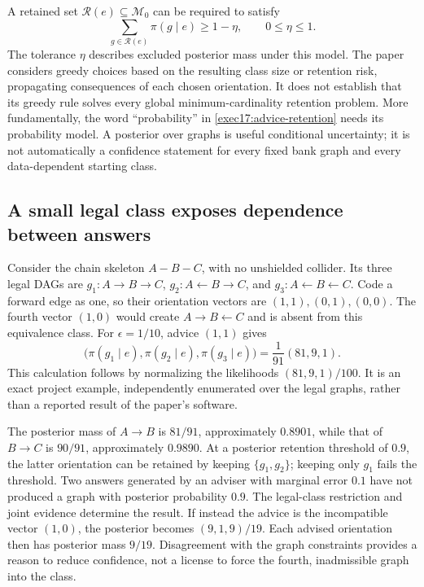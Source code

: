 A retained set $\mathcal R(e)\subseteq\mathcal M_0$ can be required to satisfy
\begin{equation}
 \sum_{g\in\mathcal R(e)}\pi(g\mid e)\geq 1-\eta,
 \qquad 0\leq\eta\leq1.
\label{exec17:advice-retention}
\end{equation}
The tolerance $\eta$ describes excluded posterior mass under this model.
The paper considers greedy choices based on the resulting class size or
retention risk, propagating consequences of each chosen orientation. It does
not establish that its greedy rule solves every global minimum-cardinality
retention problem. More fundamentally, the word ``probability'' in
\eqref{exec17:advice-retention} needs its probability model. A posterior over
graphs is useful conditional uncertainty; it is not automatically a
confidence statement for every fixed bank graph and every data-dependent
starting class.

\subsection{A small legal class exposes dependence between answers}

Consider the chain skeleton $A-B-C$, with no unshielded collider. Its three
legal DAGs are $g_1:A\to B\to C$, $g_2:A\leftarrow B\to C$, and
$g_3:A\leftarrow B\leftarrow C$. Code a forward edge as one, so their
orientation vectors are $(1,1),(0,1),(0,0)$. The fourth vector $(1,0)$ would
create $A\to B\leftarrow C$ and is absent from this equivalence class.
For $\epsilon=1/10$, advice $(1,1)$ gives
\begin{equation}
 \bigl(\pi(g_1\mid e),\pi(g_2\mid e),\pi(g_3\mid e)\bigr)
       =\frac{1}{91}(81,9,1).
\label{exec17:advice-chain}
\end{equation}
This calculation follows by normalizing the likelihoods
$(81,9,1)/100$. It is an exact project example, independently enumerated over
the legal graphs, rather than a reported result of the paper's software.
\citep{exec17_advice_validity_exact}

The posterior mass of $A\to B$ is $81/91$, approximately $0.8901$, while that
of $B\to C$ is $90/91$, approximately $0.9890$. At a posterior retention
threshold of $0.9$, the latter orientation can be retained by keeping
$\{g_1,g_2\}$; keeping only $g_1$ fails the threshold. Two answers generated by
an adviser with marginal error $0.1$ have not produced a graph with posterior
probability $0.9$. The legal-class restriction and joint evidence determine
the result. If instead the advice is the incompatible vector $(1,0)$, the
posterior becomes $(9,1,9)/19$. Each advised orientation then has posterior
mass $9/19$. Disagreement with the graph constraints provides a reason to
reduce confidence, not a license to force the fourth, inadmissible graph into
the class.

